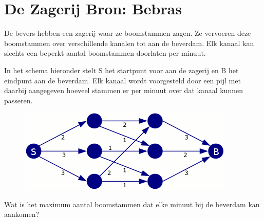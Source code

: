 \documentclass[12pt, a4paper]{article}
\begin{document}
	\begin{minipage}{\textwidth}
		\section{De Zagerij \hfill\small Bron: Bebras}
			De bevers hebben een zagerij waar ze boomstammen zagen. Ze vervoeren deze boomstammen over verschillende kanalen tot aan de beverdam. Elk kanaal kan slechts een beperkt aantal boomstammen doorlaten per minuut.
			
			In het schema hieronder stelt S het startpunt voor aan de zagerij en B het eindpunt aan de beverdam. Elk kanaal wordt voorgesteld door een pijl met daarbij aangegeven hoeveel stammen er per minuut over dat kanaal kunnen passeren.
			
			\begin{figure}[H]
				\centering
				\includegraphics[width=0.8\linewidth]{image1} 
			\end{figure}

			Wat is het maximum aantal boomstammen dat elke minuut bij de beverdam kan aankomen?


	\end{minipage} \\ \\
	
\end{document}
